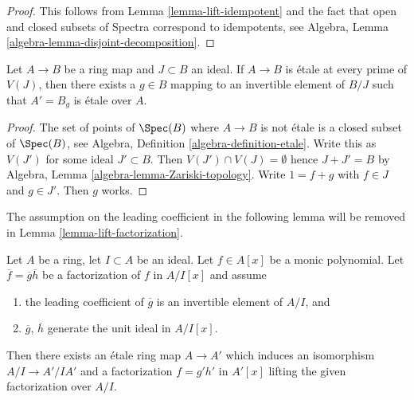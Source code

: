 \begin{proof}
This follows from Lemma \ref{lemma-lift-idempotent} and
the fact that open and closed subsets of Spectra correspond
to idempotents, see Algebra, Lemma \ref{algebra-lemma-disjoint-decomposition}.
\end{proof}

\begin{lemma}
\label{lemma-localize-upstairs}
Let $A \to B$ be a ring map and $J \subset B$ an ideal. If
$A \to B$ is \'etale at every prime of $V(J)$, then there exists
a $g \in B$ mapping to an invertible element
of $B/J$ such that $A' = B_g$ is \'etale over $A$.
\end{lemma}

\begin{proof}
The set of points of $\Spec(B)$ where $A \to B$ is not \'etale is a
closed subset of $\Spec(B)$, see
Algebra, Definition \ref{algebra-definition-etale}.
Write this as $V(J')$ for some ideal $J' \subset B$. Then
$V(J') \cap V(J) = \emptyset$ hence $J + J' = B$ by
Algebra, Lemma \ref{algebra-lemma-Zariski-topology}.
Write $1 = f + g$ with $f \in J$ and $g \in J'$.
Then $g$ works.
\end{proof}

\noindent
The assumption on the leading coefficient in the following lemma
will be removed in Lemma \ref{lemma-lift-factorization}.

\begin{lemma}
\label{lemma-lift-factorization-easy}
Let $A$ be a ring, let $I \subset A$ be an ideal. Let $f \in A[x]$ be a
monic polynomial. Let $\overline{f} = \overline{g} \overline{h}$ be a
factorization of $f$ in $A/I[x]$ and assume
\begin{enumerate}
\item the leading coefficient of $\overline{g}$ is an invertible element
of $A/I$, and
\item $\overline{g}$, $\overline{h}$ generate the unit ideal in $A/I[x]$.
\end{enumerate}
Then there exists an \'etale ring map $A \to A'$ which induces an
isomorphism $A/I \to A'/IA'$ and a factorization $f = g' h'$ in $A'[x]$
lifting the given factorization over $A/I$.
\end{lemma}

